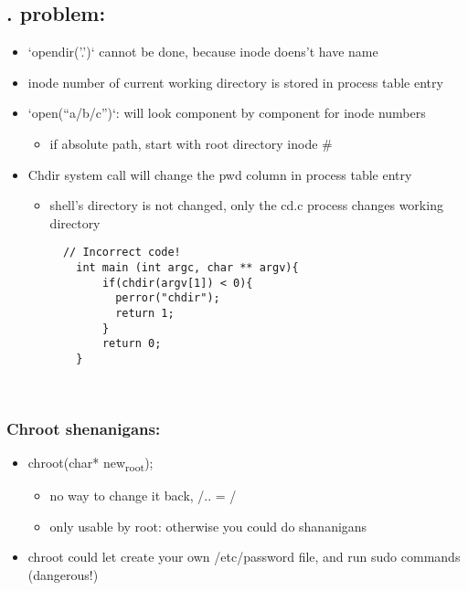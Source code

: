 \documentclass[11pt]{article}
\begin{document}
\subsection{. problem:}
\label{sec:orgf0476f9}
\begin{itemize}
\item `opendir('.')` cannot be done, because inode doens't have name
\item inode number of current working directory is stored in process table entry
\item `open(``a/b/c'')`: will look component by component for inode numbers
\begin{itemize}
\item if absolute path, start with root directory inode \#
\end{itemize}
\item Chdir system call will change the pwd column in process table entry
\begin{itemize}
\item shell's directory is not changed, only the cd.c process changes working directory
\begin{verbatim}
  // Incorrect code!
    int main (int argc, char ** argv){
        if(chdir(argv[1]) < 0){
          perror("chdir");
          return 1;
        }
        return 0;
    }



\end{verbatim}
\end{itemize}
\end{itemize}
\subsubsection{Chroot shenanigans:}
\label{sec:org3e8b891}
\begin{itemize}
\item chroot(char* new\textsubscript{root});
\begin{itemize}
\item no way to change it back, /.. = /
\item only usable by root: otherwise you could do shananigans
\end{itemize}
\item chroot could let create your own /etc/password file, and run sudo commands (dangerous!)
\end{itemize}
\end{document}
